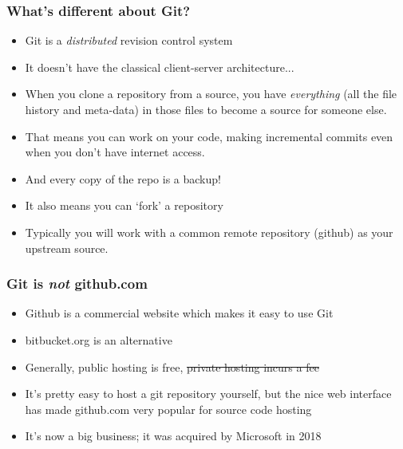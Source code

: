 \documentclass{beamer}
\begin{document}
\begin{frame}
  \frametitle{What's different about Git?}
  \begin{itemize}
  \item Git is a \emph{distributed} revision control system
    \pause \item It doesn't have the classical client-server architecture...
    \pause \item When you \alert{clone} a repository from a source, you have
    \emph{everything} (all the file history and meta-data) in those
    files to become a source for someone else.
    \pause \item That means you can work on your code, making incremental
    \alert{commits} even when you don't have internet access.
  \item And every copy of the \alert{repo} is a backup!
  \pause \item It also means you can `\alert{fork}' a repository
    \pause \item Typically you will work with a common
    \alert{remote} repository (github) as your \alert{upstream} source.
  \end{itemize}
\end{frame}

\begin{frame}
  \frametitle{Git is \emph{not} github.com}
  \begin{itemize}
  \item Github is a commercial website which makes it easy to use Git
  \item bitbucket.org is an alternative
  \pause \item Generally, public hosting is free, \sout{private hosting
  incurs a fee}
  \pause \item It's pretty easy to host a git repository yourself, but
  the nice web interface has made github.com very
  popular for source code hosting
  \pause \item It's now a big business; it was acquired by Microsoft in 2018
  \end{itemize}
\end{frame}
\end{document}
